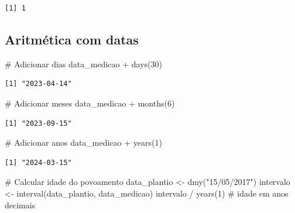 \documentclass[
  letterpaper,
]{scrbook}
\newenvironment{Shaded}{\begin{snugshade}}{\end{snugshade}}
\newcommand{\CommentTok}[1]{\textcolor[rgb]{0.37,0.37,0.37}{#1}}
\newcommand{\DecValTok}[1]{\textcolor[rgb]{0.68,0.00,0.00}{#1}}
\newcommand{\FunctionTok}[1]{\textcolor[rgb]{0.28,0.35,0.67}{#1}}
\newcommand{\NormalTok}[1]{\textcolor[rgb]{0.00,0.23,0.31}{#1}}
\newcommand{\OtherTok}[1]{\textcolor[rgb]{0.00,0.23,0.31}{#1}}
\newcommand{\SpecialCharTok}[1]{\textcolor[rgb]{0.37,0.37,0.37}{#1}}
\newcommand{\StringTok}[1]{\textcolor[rgb]{0.13,0.47,0.30}{#1}}
\begin{document}
\begin{verbatim}
[1] 1
\end{verbatim}

\subsection{Aritmética com datas}\label{aritmuxe9tica-com-datas}

\begin{Shaded}
\begin{Highlighting}[]
\CommentTok{\# Adicionar dias}
\NormalTok{data\_medicao }\SpecialCharTok{+} \FunctionTok{days}\NormalTok{(}\DecValTok{30}\NormalTok{)}
\end{Highlighting}
\end{Shaded}

\begin{verbatim}
[1] "2023-04-14"
\end{verbatim}

\begin{Shaded}
\begin{Highlighting}[]
\CommentTok{\# Adicionar meses}
\NormalTok{data\_medicao }\SpecialCharTok{+} \FunctionTok{months}\NormalTok{(}\DecValTok{6}\NormalTok{)}
\end{Highlighting}
\end{Shaded}

\begin{verbatim}
[1] "2023-09-15"
\end{verbatim}

\begin{Shaded}
\begin{Highlighting}[]
\CommentTok{\# Adicionar anos}
\NormalTok{data\_medicao }\SpecialCharTok{+} \FunctionTok{years}\NormalTok{(}\DecValTok{1}\NormalTok{)}
\end{Highlighting}
\end{Shaded}

\begin{verbatim}
[1] "2024-03-15"
\end{verbatim}

\begin{Shaded}
\begin{Highlighting}[]
\CommentTok{\# Calcular idade do povoamento}
\NormalTok{data\_plantio }\OtherTok{\textless{}{-}} \FunctionTok{dmy}\NormalTok{(}\StringTok{"15/05/2017"}\NormalTok{)}
\NormalTok{intervalo }\OtherTok{\textless{}{-}} \FunctionTok{interval}\NormalTok{(data\_plantio, data\_medicao)}
\NormalTok{intervalo }\SpecialCharTok{/} \FunctionTok{years}\NormalTok{(}\DecValTok{1}\NormalTok{)    }\CommentTok{\# idade em anos decimais}
\end{Highlighting}
\end{Shaded}
\end{document}
